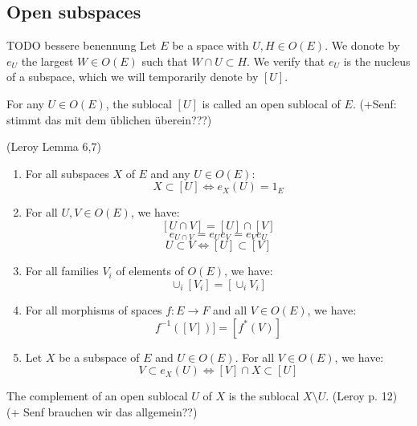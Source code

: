 \subsection{Open subspaces}
\begin{definition}[$e_U$]
    TODO bessere benennung
    \label{def:e_U}
    \leanok
    Let $E$ be a space with $U, H \in O(E)$. We donote by $e_U$ the largest $W \in O(E)$ such that $W \cap U \subset H$. We verify that $e_U$ is the nucleus of a subspace, which we will temporarily denote by $[U]$.
\end{definition}


\begin{definition}
    \label{def:open_sublocal}
    For any $U \in O(E)$, the sublocal $[U]$ is called an open sublocal of $E$.
    (+Senf: stimmt das mit dem üblichen überein???)
\end{definition}


\begin{lemma}
(Leroy Lemma 6,7)
    \label{lem:open_subspaces}
    \begin{enumerate}
        \item For all subspaces $X$ of $E$ and any $U \in O(E)$:
        \[X \subset [U] \iff e_X(U) = 1_E\]

        \item For all $U, V \in O(E)$, we have:
        \[[U \cap V] = [U] \cap [V]\]
        \[e_{U \cap V} = e_Ue_V=e_Ve_U\]
        \[U \subset V \iff [U] \subset [V]\]
        \item
        For all families $V_i$ of elements of $O(E)$, we have:
        \[\cup_i[V_i] = [\cup_iV_i]\]

        \item
        For all morphisms of spaces $f: E \to F$ and all $V \in O(E)$, we have:
        \[f^{-1}([V])] = [f^*(V)]\]
        \item
        Let $X$ be a subspace of $E$ and $U \in O(E)$. For all $V \in O(E)$, we have:
        \[V \subset e_X(U) \iff [V] \cap X \subset [U]\]
    \end{enumerate}
\end{lemma}


\begin{definition}[Complement]
    \label{def:complement}
    The complement of an open sublocal $U$ of $X$ is the sublocal $X \setminus U$.
    (Leroy p. 12) (+ Senf brauchen wir das allgemein??)
\end{definition}

